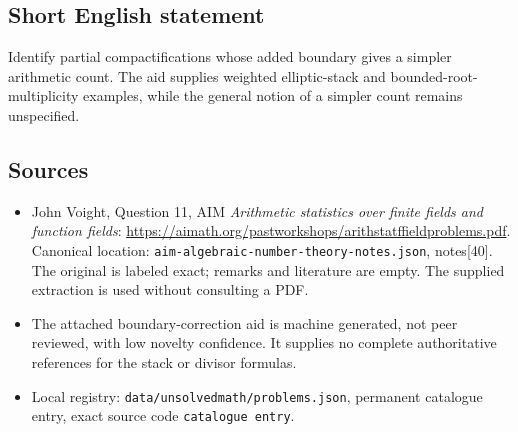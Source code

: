 \documentclass[11pt]{article}
\begin{document}
\subsection{Short English statement}
Identify partial compactifications whose added boundary gives a simpler arithmetic count. The aid supplies weighted elliptic-stack and bounded-root-multiplicity examples, while the general notion of a simpler count remains unspecified.
\subsection{Sources}
\begin{itemize}
\item John Voight, Question 11, AIM \emph{Arithmetic statistics over finite fields and function fields}: \url{https://aimath.org/pastworkshops/arithstatffieldproblems.pdf}. Canonical location: \texttt{aim-algebraic-number-theory-notes.json}, notes[40]. The original is labeled exact; remarks and literature are empty. The supplied extraction is used without consulting a PDF.
\item The attached boundary-correction aid is machine generated, not peer reviewed, with low novelty confidence. It supplies no complete authoritative references for the stack or divisor formulas.
\item Local registry: \texttt{data/unsolvedmath/problems.json}, permanent catalogue entry, exact source code \texttt{catalogue entry}.
\end{itemize}
\end{document}
